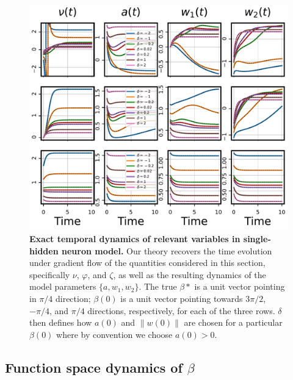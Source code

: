 \documentclass{article}
\theoremstyle{plain}
\theoremstyle{definition}
\theoremstyle{remark}
\begin{document}
\begin{figure}[H]
    \centering
    \includegraphics[width=\columnwidth]{fig/single-neuron/param_trajectories_v2.pdf}

    \caption{\textbf{Exact temporal dynamics of relevant variables in single-hidden neuron model.} Our theory recovers the time evolution under gradient flow of the quantities considered in this section, specifically $\nu$, $\varphi$, and $\zeta$, as well as the resulting dynamics of the model parameters $\{a, w_1, w_2\}$. The true $\beta*$ is a unit vector pointing in $\pi/4$ direction; $\beta(0)$ is a unit vector pointing towards $3\pi/2$, $-\pi/4$, and $\pi/4$ directions, respectively, for each of the three rows. $\delta$ then defines how $a(0)$ and $\|w(0)\|$ are chosen for a particular $\beta(0)$ where by convention we choose $a(0) > 0$.}
    \label{fig:single-neuron-trajectories}
\end{figure}




\subsection{Function space dynamics \texorpdfstring{of $\beta$}{}}
\label{app:single-neuron-beta}
\end{document}
